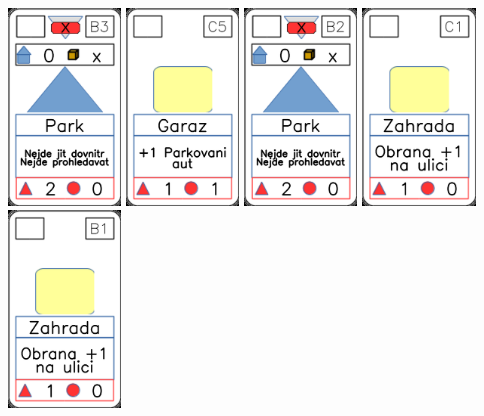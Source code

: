 \documentclass[a4paper]{article}
\begin{document}
	\includegraphics[width=3.0cm]{img-3_22}
	\includegraphics[width=3.0cm]{img-2_14}
	\includegraphics[width=3.0cm]{img-3_21}
	\includegraphics[width=3.0cm]{img-2_25}
	\includegraphics[width=3.0cm]{img-2_20}
\end{document}
